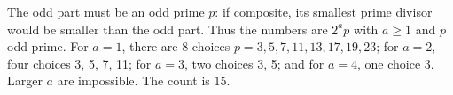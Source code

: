The odd part must be an odd prime $ p $: if composite, its smallest prime divisor would be smaller than the odd part. Thus the numbers are $ 2^ap $ with $ a\ge1 $ and $ p $ odd prime. For $ a=1 $, there are 8 choices $ p=3,5,7,11,13,17,19,23 $; for $ a=2 $, four choices 3, 5, 7, 11; for $ a=3 $, two choices 3, 5; and for $ a=4 $, one choice 3. Larger $ a $ are impossible. The count is $\boxed{15}$.
